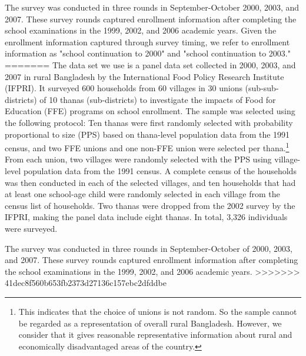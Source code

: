 \documentclass[12pt,letterpaper]{article}
\newcommand{\0}{\ensuremath{\mbox{\boldmath $0$}}}
\begin{document}
The survey was conducted in three rounds in September-October 2000, 2003, and 2007. These survey rounds captured enrollment information after completing the school examinations in the 1999, 2002, and 2006 academic years. Given the enrollment information captured through survey timing, we refer to enrollment information as "school continuation to 2000" and "school continuation to 2003."
=======
The data set we use is a panel data set collected in 2000, 2003, and 2007 in rural Bangladesh by the International Food Policy Research Institute (IFPRI). It surveyed 600 households from 60 villages in 30 unions (sub-sub-districts) of 10 thanas (sub-districts) to investigate the impacts of Food for Education (FFE) programs on school enrollment. The sample was selected using the following protocol: Ten thanas were first randomly selected with probability proportional to size (PPS) based on thana-level population data from the 1991 census, and two FFE unions and one non-FFE union were selected per thana.\footnote{This indicates that the choice of unions is not random. So  the sample cannot be regarded as a representation of overall rural Bangladesh. However, we consider that it gives reasonable representative information about rural and economically disadvantaged areas of the country. } From each union, two villages were randomly selected with the PPS using village-level population data from the 1991 census. A complete census of the households was then conducted in each of the selected villages, and ten households that had at least one school-age child were randomly selected in each village from the census list of households. Two thanas were dropped from the 2002 survey by the IFPRI, making the panel data include eight thanas. In total, 3,326 individuals were surveyed. 

The survey was conducted in three rounds in September-October of 2000, 2003, and 2007. These survey rounds captured enrollment information after completing the school examinations in the 1999, 2002, and 2006 academic years. %
>>>>>>> 41dec8f560b653fb2373d27136c157ebc2dfddbe
\end{document}
